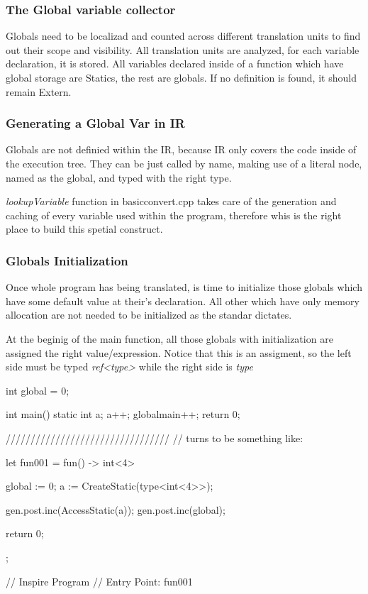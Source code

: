 \subsubsection{The Global variable collector}

Globals need to be localizad and counted across different translation units to find out their scope
and visibility.  All translation units are analyzed, for each variable declaration, it is stored. 
All variables declared inside of a function which have global storage are Statics, the rest are
globals. If no definition is found, it should remain Extern.

\subsubsection{Generating a Global Var in IR}

Globals are not definied within the IR, because IR only covers the code inside of the execution
tree. They can be just called by name, making use of a literal node, named as the global, and typed
with the right type.

\textit{lookupVariable} function in basicconvert.cpp takes care of the generation and caching of every
variable used within the program, therefore whis is the right place to build this spetial construct.

\subsubsection{Globals Initialization}

Once whole program has being translated, is time to initialize those globals which have some default
value at their's declaration. All other which have only memory allocation are not needed to be
initialized as the standar dictates. 

At the beginig of the main function, all those globals with initialization are assigned the right
value/expression. Notice that this is an assigment, so the left side must be typed
\textit{ref<type>} while the right side is \textit{type}

\begin{srcCode}
int global = 0;

int main(){
	static int a;  
	a++;
	globalmain++;
	return 0;
}

/////////////////////////////////
// turns to be something like:

let fun001 = fun() -> int<4> {
    global := 0;
	a := CreateStatic(type<int<4>>);

	gen.post.inc(AccessStatic(a));
	gen.post.inc(global);

	return 0;
};

// Inspire Program 
//  Entry Point: 
fun001

\end{srcCode}


